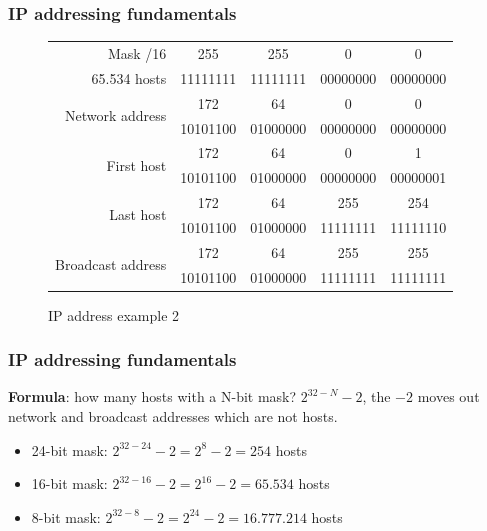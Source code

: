   \begin{frame}
    \frametitle{IP addressing fundamentals}
    \begin{figure}
        \centering
      \begin{tabular}{|r|cccc|}
        \hline
        Mask {\color{brown}/16} & {\color{brown}255} & {\color{brown}255} & {\color{fuchsia}0} & {\color{fuchsia}0} \\
        65.534 {\color{blue}hosts} & {\color{brown}11111111} & {\color{brown}11111111} & {\color{fuchsia}00000000} & {\color{fuchsia}00000000} \\ \hline
        \multirow{2}{*}{Network address} & \color{ForestGreen}172 & \color{ForestGreen}64 & \color{blue}0 & \color{blue}0 \\
        & \color{ForestGreen}10101100 & \color{ForestGreen}01000000 & \color{blue}00000000 & \color{blue}00000000 \\ \hline
        \multirow{2}{*}{First host} & \color{ForestGreen}172 & \color{ForestGreen}64 & \color{blue}0 & \color{blue}1 \\
        & \color{ForestGreen}10101100 & \color{ForestGreen}01000000 & \color{blue}00000000 & \color{blue}00000001 \\ \hline
        \multirow{2}{*}{Last host} & \color{ForestGreen}172 & \color{ForestGreen}64 & \color{blue}255 & \color{blue}254 \\
        & \color{ForestGreen}10101100 & \color{ForestGreen}01000000 & \color{blue}11111111 & \color{blue}11111110 \\ \hline
        \multirow{2}{*}{Broadcast address} & \color{ForestGreen}172 & \color{ForestGreen}64 & \color{blue}255 & \color{blue}255 \\
        & \color{ForestGreen}10101100 & \color{ForestGreen}01000000 & \color{blue}11111111 & \color{blue}11111111 \\ \hline
      \end{tabular}
      \caption{IP address example 2}
    \end{figure}
  \end{frame}

  \begin{frame}
    \frametitle{IP addressing fundamentals}
    \begin{block}{\textbf{Formula}: how many {\color{blue}hosts} with a N-bit mask?}
      $2^{32-N}-2$\pause, the $-2$ moves out network and broadcast addresses which are not {\color{blue}hosts}.\pause
      \begin{itemize}
        \item 24-bit {\color{brown}mask}: $2^{32-24}-2 = 2^{8}-2 = 254$ {\color{blue}hosts} \pause
        \item 16-bit {\color{brown}mask}: $2^{32-16}-2 = 2^{16}-2 = 65.534$ {\color{blue}hosts} \pause
        \item 8-bit {\color{brown}mask}: $2^{32-8}-2 = 2^{24}-2 = 16.777.214$ {\color{blue}hosts}
      \end{itemize}
    \end{block}
  \end{frame}

